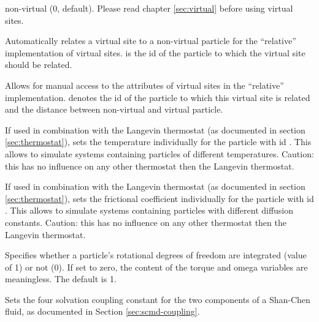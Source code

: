 \begin{arguments}
  non-virtual (0, default). Please read chapter \ref{sec:virtual}
  before using virtual sites.
\item[\opt{vs\_auto\_relate\_to \var{pid}}] Automatically relates a
  virtual site to a non-virtual particle for the ``relative''
  implementation of virtual sites.  is the id of the particle
  to which the virtual site should be related.
\item[\opt{vs\_relative \var{pid} \var{distance}}] Allows for manual
  access to the attributes of virtual sites in the ``relative''
  implementation.  denotes the id of the particle to which
  this virtual site is related and  the distance between
  non-virtual and virtual particle.
\item[\opt{temp \var{T}}] If used in combination with the Langevin
  thermostat (as documented in section \ref{sec:thermostat}), sets the
  temperature  individually for the particle with id
  . This allows to simulate systems containing particles of
  different temperatures. Caution: this has no influence on any other
  thermostat then the Langevin thermostat.
\item[\opt{gamma \var{g}}] If used in combination with the Langevin
  thermostat (as documented in section \ref{sec:thermostat}), sets the
  frictional coefficient  individually for the particle with id
  . This allows to simulate systems containing particles with
  different diffusion constants. Caution: this has no influence on any
  other thermostat then the Langevin thermostat.
\item[\opt{rotation \var{rot}}] Specifies whether a particle's
  rotational degrees of freedom are integrated (value of 1) or not
  (0). If set to zero, the content of the torque and omega variables
  are meaningless. The default is 1.
\item[\opt{solvation \var{lA} \var{kA} \var{lB} \var{kB}}] Sets the four solvation coupling constant for the two components of a Shan-Chen fluid, as documented in Section \ref{sec:scmd-coupling}.
\end{arguments}

